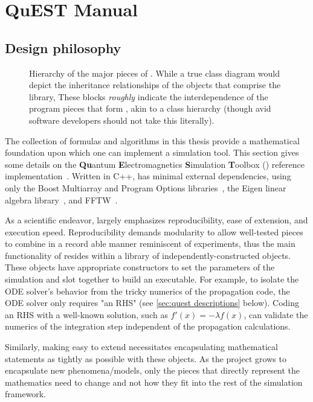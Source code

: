 \chapter{QuEST Manual}

\section{Design philosophy}

\begin{figure}
  \centering
  
  \caption{\label{fig:hierarchy}Hierarchy of the major pieces of \QuEST{}.
    While a true class diagram would depict the inheritance relationships of the objects that comprise the \QuEST{} library, 
  These blocks \emph{roughly} indicate the interdependence of the program pieces that form \QuEST{}, akin to a class hierarchy (though avid software developers should not take this literally).}
\end{figure}

The collection of formulas and algorithms in this thesis provide a mathematical foundation upon which one can implement a simulation tool. This section gives some details on the \textbf{Qu}antum \textbf{E}lectromagnetics \textbf{S}imulation \textbf{T}oolbox (\QuEST{}) reference implementation~\cite{github}. Written in C++, \QuEST{} has minimal external dependencies, using only the Boost Multiarray and Program Options libraries~\cite{boost}, the Eigen linear algebra library~\cite{eigen}, and FFTW~\cite{fftw}.

As a scientific endeavor, \QuEST{} largely emphasizes reproducibility, ease of extension, and execution speed.
Reproducibility demands modularity to allow well-tested pieces to combine in a record able manner reminiscent of experiments, thus the main functionality of \QuEST{} resides within a library of independently-constructed objects.
These objects have appropriate constructors to set the parameters of the simulation and slot together to build an executable.
For example, to isolate the ODE solver's behavior from the tricky numerics of the propagation code, the ODE solver only requires "an RHS" (see \cref{sec:quest descriptions} below).
Coding an RHS with a well-known solution, such as $f'(x) = - \lambda f(x)$, can validate the numerics of the integration step independent of the propagation calculations.

Similarly, making \QuEST{} easy to extend necessitates encapsulating mathematical statements as tightly as possible with these objects.
As the project grows to encapsulate new phenomena/models, only the pieces that directly represent the mathematics need to change and not how they fit into the rest of the simulation framework.

